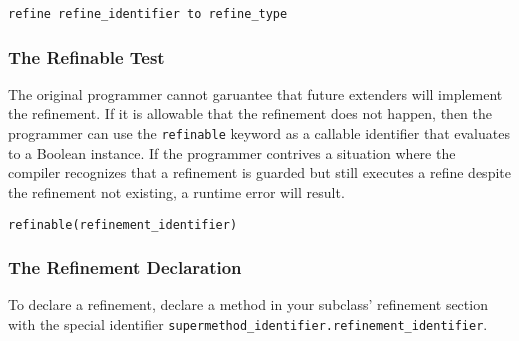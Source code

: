 \begin{lstlisting}
refine refine_identifier to refine_type
\end{lstlisting}

\subsubsection{The Refinable Test}
The original programmer cannot garuantee that future extenders will implement the refinement. If it is allowable that the refinement does not happen, then the programmer can use the \verb!refinable! keyword as a callable identifier that evaluates to a Boolean instance. If the programmer contrives a situation where the compiler recognizes that a refinement is guarded but still executes a refine despite the refinement not existing, a runtime error will result.

\begin{lstlisting}
refinable(refinement_identifier)
\end{lstlisting}

\subsubsection{The Refinement Declaration}
To declare a refinement, declare a method in your subclass' refinement section with the special identifier \verb!supermethod_identifier.refinement_identifier!.